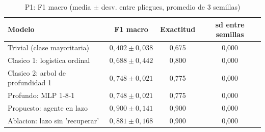 \begin{table}[!t]
\centering
\caption{P1: F1 macro (media $\pm$ desv. entre pliegues, promedio de 3 semillas)}
\label{tab:tabla2}
\begin{tabular}{lccc}
\hline
Modelo & F1 macro & Exactitud & sd entre semillas \\
\hline
Trivial (clase mayoritaria) & $0{,}402 \pm 0{,}038$ & 0,675 & 0,000 \\
Clasico 1: logistica ordinal & $0{,}688 \pm 0{,}442$ & 0,800 & 0,000 \\
Clasico 2: arbol de profundidad 1 & $0{,}748 \pm 0{,}021$ & 0,775 & 0,000 \\
Profundo: MLP 1-8-1 & $0{,}748 \pm 0{,}021$ & 0,775 & 0,000 \\
Propuesto: agente en lazo & $0{,}900 \pm 0{,}141$ & 0,900 & 0,000 \\
Ablacion: lazo sin 'recuperar' & $0{,}881 \pm 0{,}168$ & 0,900 & 0,000 \\
\hline
\end{tabular}
\end{table}
